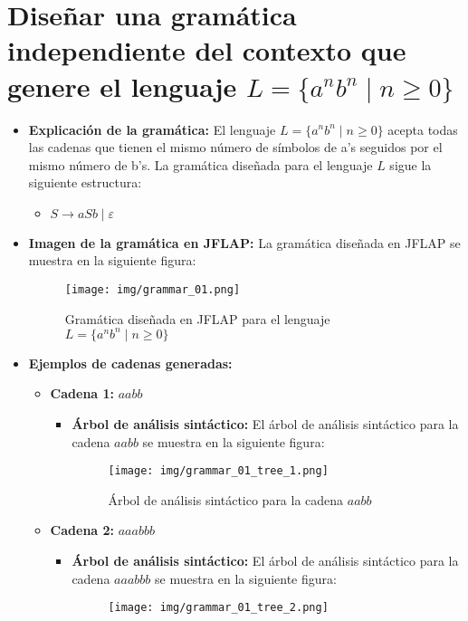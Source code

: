 \documentclass[11pt]{report}
\begin{document}
\section{Diseñar una gramática independiente del contexto que genere el lenguaje \texorpdfstring{$L = \{a^n b^n \mid n \geq 0\}$}{L = \{a^n b^n | n >= 0\}}}
\begin{itemize}
  \item \textbf{Explicación de la gramática:} El lenguaje $L = \{a^n b^n \mid n \geq 0\}$ acepta todas las cadenas que tienen el mismo número de símbolos de
  a's seguidos por el mismo número de b's. La gramática diseñada para el lenguaje $L$ sigue la siguiente estructura:
  \begin{itemize}
    \item $S \rightarrow aSb \mid \varepsilon$
  \end{itemize}
  \item \textbf{Imagen de la gramática en JFLAP:} La gramática diseñada en JFLAP se muestra en la siguiente figura:
  \begin{figure}[H]
    \centering
    \texttt{[image: img/grammar\_01.png]}
    \caption{Gramática diseñada en JFLAP para el lenguaje $L = \{a^n b^n \mid n \geq 0\}$}
  \end{figure}
  \item \textbf{Ejemplos de cadenas generadas:}
  \begin{itemize}
    \item \textbf{Cadena 1:} $aabb$
    \begin{itemize}
      \item \textbf{Árbol de análisis sintáctico:} El árbol de análisis sintáctico para la cadena $aabb$ se muestra en la siguiente figura:
      \begin{figure}[H]
        \centering
        \texttt{[image: img/grammar\_01\_tree\_1.png]}
        \caption{Árbol de análisis sintáctico para la cadena $aabb$}
        \label{fig:arbol1}
      \end{figure}
    \end{itemize}
    \item \textbf{Cadena 2:} $aaabbb$
    \begin{itemize}
      \item \textbf{Árbol de análisis sintáctico:} El árbol de análisis sintáctico para la cadena $aaabbb$ se muestra en la siguiente figura:
      \begin{figure}[H]
        \centering
        \texttt{[image: img/grammar\_01\_tree\_2.png]}

\end{figure}
\end{itemize}
\end{itemize}
\end{itemize}
\end{document}
